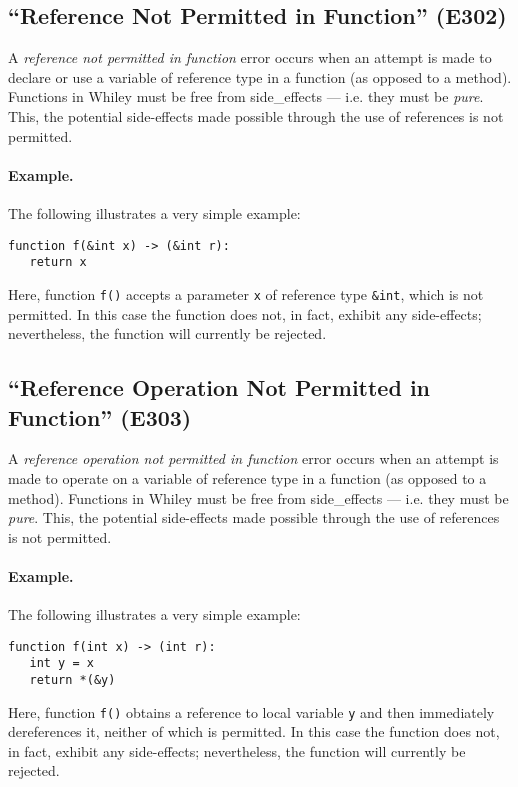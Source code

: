 \subsection{``Reference Not Permitted in Function'' (E302)}

A {\em reference not permitted in function} error occurs when an attempt is made to declare or use a variable of reference type in a function (as opposed to a method).  Functions in Whiley must be free from \glspl{side_effect} --- i.e. they must be {\em pure}.  This, the potential side-effects made possible through the use of references is not permitted.

\paragraph{Example.}  The following illustrates a very simple example:

\begin{lstlisting}
function f(&int x) -> (&int r):
   return x
\end{lstlisting}

Here, function \lstinline{f()} accepts a parameter \lstinline{x} of reference type \lstinline{&int}, which is not permitted.  In this case the function does not, in fact, exhibit any side-effects; nevertheless, the function will currently be rejected.

\subsection{``Reference Operation Not Permitted in Function'' (E303)}

A {\em reference operation not permitted in function} error occurs when an attempt is made to operate on a variable of reference type in a function (as opposed to a method).  Functions in Whiley must be free from \glspl{side_effect} --- i.e. they must be {\em pure}.  This, the potential side-effects made possible through the use of references is not permitted.

\paragraph{Example.}  The following illustrates a very simple example:

\begin{lstlisting}
function f(int x) -> (int r):
   int y = x
   return *(&y)
\end{lstlisting}

Here, function \lstinline{f()} obtains a reference to local variable \lstinline{y} and then immediately dereferences it, neither of which is permitted.  In this case the function does not, in fact, exhibit any side-effects; nevertheless, the function will currently be rejected.

